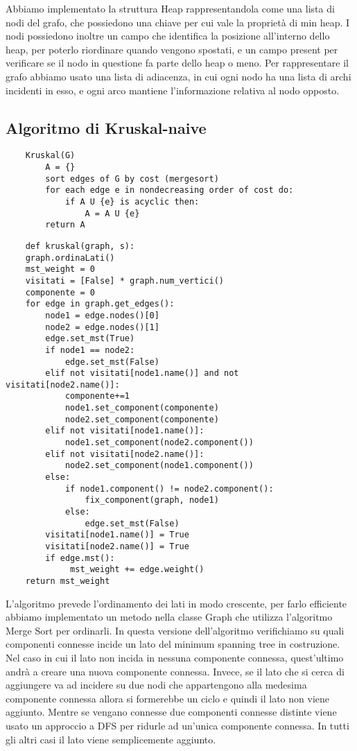 Abbiamo implementato la struttura Heap rappresentandola come una lista di nodi del grafo, che possiedono una chiave per cui vale la proprietà di min heap.
I nodi possiedono inoltre un campo che identifica la posizione all'interno dello heap, per poterlo riordinare quando vengono spostati, e un campo present per verificare se il nodo in questione fa parte dello heap o meno.
Per rappresentare il grafo abbiamo usato una lista di adiacenza, in cui ogni nodo ha una lista di archi incidenti in esso, e ogni arco mantiene l'informazione relativa al nodo opposto.

\clearpage

\subsection{Algoritmo di Kruskal-naive}
\begin{verbatim}
    Kruskal(G)
        A = {}
        sort edges of G by cost (mergesort)
        for each edge e in nondecreasing order of cost do:
            if A U {e} is acyclic then:
                A = A U {e}
        return A
\end{verbatim}    

\begin{verbatim}
    def kruskal(graph, s):
    graph.ordinaLati()
    mst_weight = 0
    visitati = [False] * graph.num_vertici()
    componente = 0
    for edge in graph.get_edges(): 
        node1 = edge.nodes()[0]
        node2 = edge.nodes()[1]
        edge.set_mst(True)
        if node1 == node2:
            edge.set_mst(False)
        elif not visitati[node1.name()] and not visitati[node2.name()]:
            componente+=1
            node1.set_component(componente)
            node2.set_component(componente)
        elif not visitati[node1.name()]:
            node1.set_component(node2.component())
        elif not visitati[node2.name()]:
            node2.set_component(node1.component())
        else:
            if node1.component() != node2.component():
                fix_component(graph, node1)
            else:
                edge.set_mst(False)
        visitati[node1.name()] = True
        visitati[node2.name()] = True        
        if edge.mst():
             mst_weight += edge.weight()          
    return mst_weight
\end{verbatim}

L'algoritmo prevede l'ordinamento dei lati in modo crescente, per farlo efficiente abbiamo implementato un metodo nella classe Graph che utilizza l'algoritmo Merge Sort per ordinarli.
In questa versione dell'algoritmo verifichiamo su quali componenti connesse incide un lato del minimum spanning tree in costruzione.
Nel caso in cui il lato non incida in nessuna componente connessa, quest'ultimo andrà a creare una nuova componente connessa.
Invece, se il lato che si cerca di aggiungere va ad incidere su due nodi che appartengono alla medesima componente connessa allora si formerebbe un ciclo e quindi il lato non viene aggiunto.
Mentre se vengano connesse due componenti connesse distinte viene usato un approccio a DFS per ridurle ad un'unica componente connessa.
In tutti gli altri casi il lato viene semplicemente aggiunto.

